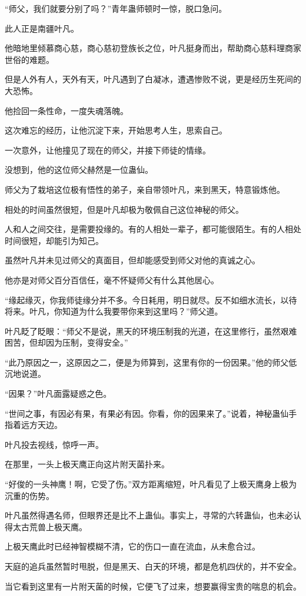 \begin{this_body}
“师父，我们就要分别了吗？”青年蛊师顿时一惊，脱口急问。

此人正是南疆叶凡。

他暗地里倾慕商心慈，商心慈初登族长之位，叶凡挺身而出，帮助商心慈料理商家世俗的难题。

但是人外有人，天外有天，叶凡遇到了白凝冰，遭遇惨败不说，更是经历生死间的大恐怖。

他捡回一条性命，一度失魂落魄。

这次难忘的经历，让他沉淀下来，开始思考人生，思索自己。

一次意外，让他撞见了现在的师父，并接下师徒的情缘。

没想到，他的这位师父赫然是一位蛊仙。

师父为了栽培这位极有悟性的弟子，亲自带领叶凡，来到黑天，特意锻炼他。

相处的时间虽然很短，但是叶凡却极为敬佩自己这位神秘的师父。

人和人之间交往，是需要投缘的。有的人相处一辈子，都可能很陌生。有的人相处时间很短，却能引为知己。

虽然叶凡并未见过师父的真面目，但却能感受到师父对他的真诚之心。

他亦是对师父百分百信任，毫不怀疑师父有什么其他居心。

“缘起缘灭，你我师徒缘分并不多。今日耗用，明日就尽。反不如细水流长，以待将来。叶凡，你知道为什么我要带你来到这里吗？”师父道。

叶凡眨了眨眼：“师父不是说，黑天的环境压制我的光道，在这里修行，虽然艰难困苦，但却因为压制，变得安全。”

“此乃原因之一，这原因之二，便是为师算到，这里有你的一份因果。”他的师父低沉地说道。

“因果？”叶凡面露疑惑之色。

“世间之事，有因必有果，有果必有因。你看，你的因果来了。”说着，神秘蛊仙手指着远方天边。

叶凡投去视线，惊呼一声。

在那里，一头上极天鹰正向这片附天菌扑来。

“好俊的一头神鹰！啊，它受了伤。”双方距离缩短，叶凡看见了上极天鹰身上极为沉重的伤势。

叶凡虽然得遇名师，但眼界还是比不上蛊仙。事实上，寻常的六转蛊仙，也未必认得太古荒兽上极天鹰。

上极天鹰此时已经神智模糊不清，它的伤口一直在流血，从未愈合过。

天庭的追兵虽然暂时甩脱，但是黑天、白天的环境，都是危机四伏的，并不安全。

当它看到这里有一片附天菌的时候，它便飞了过来，想要赢得宝贵的喘息的机会。


\end{this_body}

